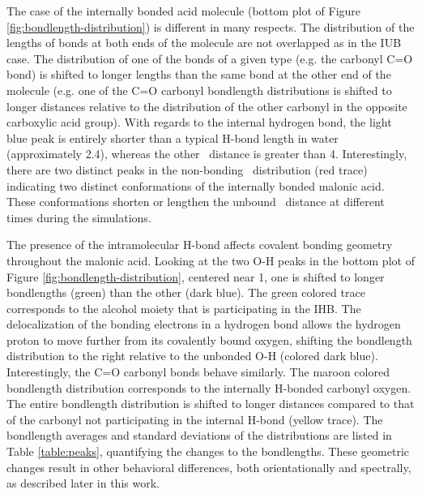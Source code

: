 The case of the internally bonded acid molecule (bottom plot of Figure \ref{fig:bondlength-distribution}) is different in many respects. The distribution of the lengths of bonds at both ends of the molecule are not overlapped as in the IUB case. The distribution of one of the bonds of a given type (e.g. the carbonyl C=O bond) is shifted to longer lengths than the same bond at the other end of the molecule (e.g. one of the C=O carbonyl bondlength distributions is shifted to longer distances relative to the distribution of the other carbonyl in the opposite carboxylic acid group). With regards to the internal hydrogen bond, the light blue peak is entirely shorter than a typical H-bond length in water (approximately 2.4\angs), whereas the other \ocarbh~distance is greater than 4\angs. Interestingly, there are two distinct peaks in the non-bonding \ocarbh~distribution (red trace) indicating two distinct conformations of the internally bonded malonic acid. These conformations shorten or lengthen the unbound \ocarbh~distance at different times during the simulations.

The presence of the intramolecular H-bond affects covalent bonding geometry throughout the malonic acid. Looking at the two O-H peaks in the bottom plot of Figure \ref{fig:bondlength-distribution}, centered near 1\angs, one is shifted to longer bondlengths (green) than the other (dark blue). The green colored trace corresponds to the alcohol moiety that is participating in the IHB. The delocalization of the bonding electrons in a hydrogen bond allows the hydrogen proton to move further from its covalently bound oxygen, shifting the bondlength distribution to the right relative to the unbonded O-H (colored dark blue). Interestingly, the C=O carbonyl bonds behave similarly. The maroon colored bondlength distribution corresponds to the internally H-bonded carbonyl oxygen. The entire bondlength distribution is shifted to longer distances compared to that of the carbonyl not participating in the internal H-bond (yellow trace). The bondlength averages and standard deviations of the distributions are listed in Table \ref{table:peaks}, quantifying the changes to the bondlengths. These geometric changes result in other behavioral differences, both orientationally and spectrally, as described later in this work.

